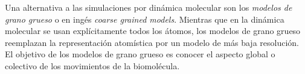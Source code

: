 Una alternativa a las simulaciones por din\'{a}mica molecular son los \textit{modelos de grano grueso} o en ing\'{e}s \textit{coarse grained models}.  Mientras que en la din\'{a}mica molecular se usan expl\'{i}citamente todos los \'{a}tomos, los modelos de grano grueso reemplazan la representaci\'{o}n atom\'{i}stica por un modelo de m\'{a}s baja resoluci\'{o}n. El objetivo de los modelos de grano grueso es conocer el aspecto global o colectivo de los movimientos de la biomol\'{e}cula.\\